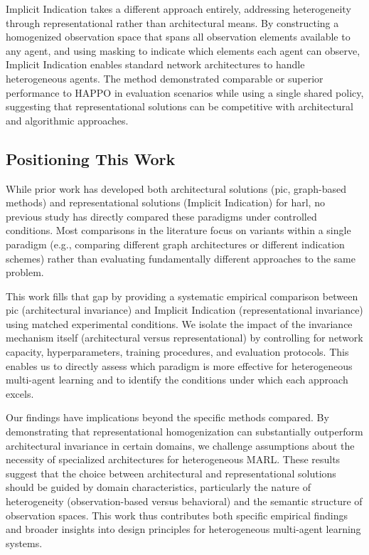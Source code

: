 \documentclass[conference]{IEEEtran}
\begin{document}
Implicit Indication%
takes a different approach entirely, 
addressing heterogeneity through representational rather than architectural means. 
By constructing a homogenized observation space that spans all 
observation elements available to any agent, and using masking to 
indicate which elements each agent can observe, 
Implicit Indication enables standard network architectures to handle heterogeneous agents. 
The method demonstrated comparable or superior performance to HAPPO in evaluation scenarios 
while using a single shared policy, suggesting that representational solutions can be 
competitive with architectural and algorithmic approaches.

\subsection{Positioning This Work}

While prior work has developed both architectural solutions (\gls{pic}, graph-based methods) 
and representational solutions (Implicit Indication) for \gls{harl}, 
no previous study has directly compared these paradigms under controlled conditions. 
Most comparisons in the literature focus on variants within a single paradigm 
(e.g., comparing different graph architectures or different indication schemes) 
rather than evaluating fundamentally different approaches to the same problem.

This work fills that gap by providing a systematic empirical comparison between 
\gls{pic} (architectural invariance) and Implicit Indication (representational invariance) 
using matched experimental conditions. 
We isolate the impact of the invariance mechanism itself (architectural versus 
representational) by controlling for network capacity, hyperparameters, training procedures, 
and evaluation protocols. 
This enables us to directly assess which paradigm is more effective for 
heterogeneous multi-agent learning and to identify the conditions under which each approach excels.

Our findings have implications beyond the specific methods compared. 
By demonstrating that representational homogenization can substantially 
outperform architectural invariance in certain domains, we challenge 
assumptions about the necessity of specialized architectures for heterogeneous MARL. 
These results suggest that the choice between architectural and representational 
solutions should be guided by domain characteristics, particularly the nature of 
heterogeneity (observation-based versus behavioral) 
and the semantic structure of observation spaces. 
This work thus contributes both specific empirical findings and broader insights 
into design principles for heterogeneous multi-agent learning systems.
\end{document}
